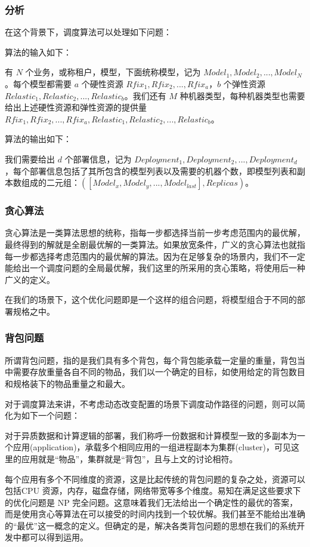 \subsubsection{分析}

在这个背景下，调度算法可以处理如下问题：

算法的输入如下：

有 $N$ 个业务，或称租户，模型，下面统称模型，记为 $Model_1,Model_2,...,Model_N$。每个模型都需要 $a$ 个硬性资源 $Rfix_1,Rfix_2,...,Rfix_a$，$b$ 个弹性资源 $Relastic_1,Relastic_2,...,Relastic_b$。我们还有 $M$ 种机器类型，每种机器类型也需要给出上述硬性资源和弹性资源的提供量 $Rfix_1,Rfix_2,...,Rfix_a,Relastic_1,Relastic_2,...,Relastic_b$。

算法的输出如下：

我们需要给出 $d$ 个部署信息，记为 $Deployment_1,Deployment_2,...,Deployment_d$，每个部署信息包括了其所包含的模型列表以及需要的机器个数，即模型列表和副本数组成的二元组：$([Model_x,Model_y,...,Model_{last}],Replicas)$。

\subsubsection{贪心算法}

贪心算法是一类算法思想的统称，指每一步都选择当前一步考虑范围内的最优解，最终得到的解就是全剧最优解的一类算法。如果放宽条件，广义的贪心算法也就指每一步都选择考虑范围内的最优解的算法。因为在足够复杂的场景内，我们不一定能给出一个调度问题的全局最优解，我们这里的所采用的贪心策略，将使用后一种广义的定义。

在我们的场景下，这个优化问题即是一个这样的组合问题，将模型组合于不同的部署规格之中。

\subsubsection{背包问题}

所谓背包问题，指的是我们具有多个背包，每个背包能承载一定量的重量，背包当中需要存放重量各自不同的物品，我们以一个确定的目标，如使用给定的背包数目和规格装下的物品重量之和最大。

对于调度算法来讲，不考虑动态改变配置的场景下调度动作路径的问题，则可以简化为如下一个问题：

对于异质数据和计算逻辑的部署，我们称呼一份数据和计算模型一致的多副本为一个应用(application)，承载多个相同应用的一组进程副本为集群(cluster)，可见这里的应用就是“物品”，集群就是“背包”，且与上文的讨论相符。

每个应用有多个不同维度的资源，这是比起传统的背包问题的复杂之处，资源可以包括CPU 资源，内存，磁盘存储，网络带宽等多个维度。易知在满足这些要求下的优化问题是 NP 完全问题。这意味着我们无法给出一个确定性的最优的答案，而是使用贪心等算法在可以接受的时间内找到一个较优解。我们甚至不能给出准确的“最优”这一概念的定义。但确定的是，解决各类背包问题的思想在我们的系统开发中都可以得到运用。

